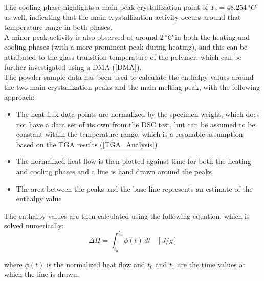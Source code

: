 \documentclass{article}
\begin{document}
        The cooling phase highlights a main peak crystallization point of $T_{c} =  48.254 \ ^{\circ}C$ as well, indicating 
        that the main crystallization activity occurs around that temperature range in both phases. \\ 

        A minor peak activity is also observed at around $2 \ ^{\circ}C$ in both the heating and cooling phases
        (with a more prominent peak during heating), and this can be attributed to the
        glass transition temperature of the polymer, which can be further investigated using a DMA (\ref{DMA}). \\

        The powder sample data has been used to calculate the enthalpy values around the two main crystallization peaks and the main 
        melting peak, with the following approach: \\

        \begin{itemize}
            \item The heat flux data points are normalized by the specimen weight, which does not have a data set of its own from the DSC test, 
            but can be assumed to be constant within the temperature range, which is a resonable 
            assumption based on the TGA results (\ref{TGA_Analysis}) 
            \item The normalized heat flow is then plotted against time for both the heating and cooling phases and 
            a line is hand drawn around the peaks
            \item The area between the peaks and the base line represents an estimate of the enthalpy value  
        \end{itemize}

        The enthalpy values are then calculated using the following equation, which is solved numerically: \\ 

        \begin{equation}
            \Delta H = \int_{t_0}^{t_1} \phi (t) \,dt \ \ \ \ [J/g]
            \label{eq:enthalpy}
        \end{equation}

        where $\phi (t)$ is the normalized heat flow and $t_0$ and $t_1$ are the time values at which the line is drawn. 

        \clearpage
\end{document}
